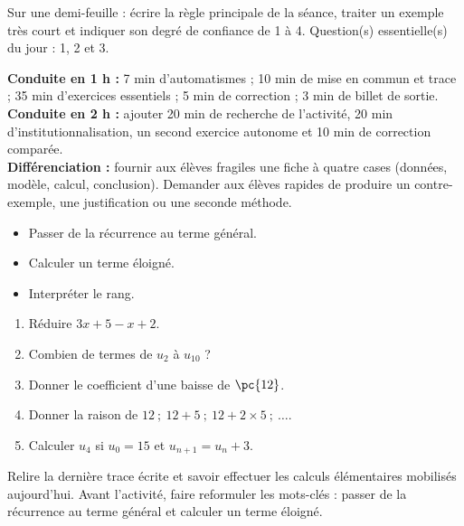     \begin{exitticket}[3 minutes]Sur une demi-feuille : écrire la règle principale de la séance, traiter un exemple très court et indiquer son degré de confiance de 1 à 4. Question(s) essentielle(s) du jour : 1, 2 et 3.\end{exitticket}

    \ifmxteacher
    \begin{method}
    \textbf{Conduite en 1 h :} 7 min d'automatismes ; 10 min de mise en commun et trace ; 35 min d'exercices essentiels ; 5 min de correction ; 3 min de billet de sortie.\\
    \textbf{Conduite en 2 h :} ajouter 20 min de recherche de l'activité, 20 min d'institutionnalisation, un second exercice autonome et 10 min de correction comparée.\\
    \textbf{Différenciation :} fournir aux élèves fragiles une fiche à quatre cases (données, modèle, calcul, conclusion). Demander aux élèves rapides de produire un contre-exemple, une justification ou une seconde méthode.
    \end{method}
    \fi
{}
\begin{objectives}\begin{itemize}\item Passer de la récurrence au terme général.\item Calculer un terme éloigné.\item Interpréter le rang.\end{itemize}\end{objectives}
\begin{fluency}\begin{enumerate}\item Réduire $3x+5-x+2$. \item Combien de termes de $u_{2}$ à $u_{10}$ ? \item Donner le coefficient d'une baisse de $\pc{12}$. \item Donner la raison de $12\ ;\ 12+5\ ;\ 12+2\times5\ ;\ \ldots$. \item Calculer $u_4$ si $u_0=15$ et $u_{n+1}=u_n+3$. \end{enumerate}\end{fluency}
\begin{prerequisites}Relire la dernière trace écrite et savoir effectuer les calculs élémentaires mobilisés aujourd'hui. Avant l'activité, faire reformuler les mots-clés : passer de la récurrence au terme général et calculer un terme éloigné.\end{prerequisites}

